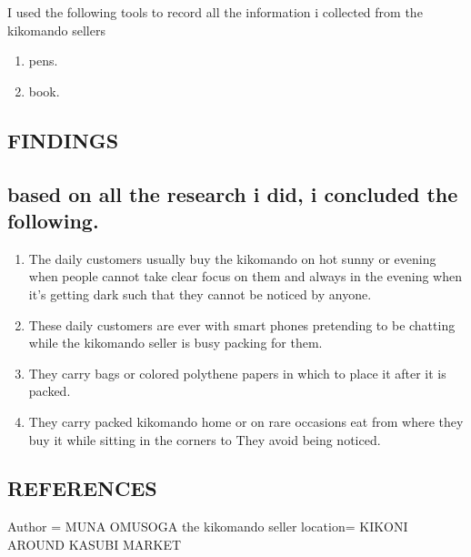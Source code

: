 \documentclass[a4paper,20pt]{report}
\begin{document}
I used the following tools to record all the information i collected from the kikomando sellers
\begin {enumerate}

\item pens.
\item book.
\end {enumerate}
\subsection{FINDINGS}
\subsection{based on all the research i did, i concluded the following.}
\begin{enumerate}
\item{The daily customers usually buy the kikomando on hot sunny or evening when people cannot take clear focus on them and always in the evening when it’s getting dark such that they cannot be noticed by anyone.}
\item{These daily customers are ever with smart phones pretending to be chatting while the kikomando seller is busy packing for them.}
\item{They carry bags or colored polythene papers in which to place it after it is packed.}
\item{They carry packed kikomando home or on rare occasions eat from where they buy it while sitting in the corners to They avoid being noticed.}
\end{enumerate}

\subsection{REFERENCES}
Author = MUNA OMUSOGA the kikomando seller
location= {KIKONI AROUND KASUBI MARKET}
\end{document}
